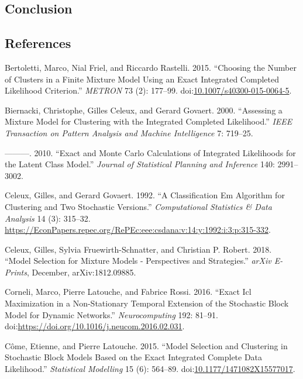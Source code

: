 \documentclass[]{article}
\begin{document}
\subsection{Conclusion}\label{conclusion}

\subsection*{References}\label{references}

\hypertarget{refs}{}
\hypertarget{ref-Bertoletti2015}{}
Bertoletti, Marco, Nial Friel, and Riccardo Rastelli. 2015. ``Choosing
the Number of Clusters in a Finite Mixture Model Using an Exact
Integrated Completed Likelihood Criterion.'' \emph{METRON} 73 (2):
177--99.
doi:\href{https://doi.org/10.1007/s40300-015-0064-5}{10.1007/s40300-015-0064-5}.

\hypertarget{ref-Biernacki2000}{}
Biernacki, Christophe, Gilles Celeux, and Gerard Govaert. 2000.
``Assessing a Mixture Model for Clustering with the Integrated Completed
Likelihood.'' \emph{IEEE Transaction on Pattern Analysis and Machine
Intelligence} 7: 719--25.

\hypertarget{ref-Biernacki2010}{}
---------. 2010. ``Exact and Monte Carlo Calculations of Integrated
Likelihoods for the Latent Class Model.'' \emph{Journal of Statistical
Planning and Inference} 140: 2991--3002.

\hypertarget{ref-Celeux92}{}
Celeux, Gilles, and Gerard Govaert. 1992. ``A Classification Em
Algorithm for Clustering and Two Stochastic Versions.''
\emph{Computational Statistics \& Data Analysis} 14 (3): 315--32.
\url{https://EconPapers.repec.org/RePEc:eee:csdana:v:14:y:1992:i:3:p:315-332}.

\hypertarget{ref-Celeux2018}{}
Celeux, Gilles, Sylvia Fruewirth-Schnatter, and Christian P. Robert.
2018. ``Model Selection for Mixture Models - Perspectives and
Strategies.'' \emph{arXiv E-Prints}, December, arXiv:1812.09885.

\hypertarget{ref-Corneli2016}{}
Corneli, Marco, Pierre Latouche, and Fabrice Rossi. 2016. ``Exact Icl
Maximization in a Non-Stationary Temporal Extension of the Stochastic
Block Model for Dynamic Networks.'' \emph{Neurocomputing} 192: 81--91.
doi:\href{https://doi.org/https://doi.org/10.1016/j.neucom.2016.02.031}{https://doi.org/10.1016/j.neucom.2016.02.031}.

\hypertarget{ref-Come2015}{}
Côme, Etienne, and Pierre Latouche. 2015. ``Model Selection and
Clustering in Stochastic Block Models Based on the Exact Integrated
Complete Data Likelihood.'' \emph{Statistical Modelling} 15 (6):
564--89.
doi:\href{https://doi.org/10.1177/1471082X15577017}{10.1177/1471082X15577017}.
\end{document}
